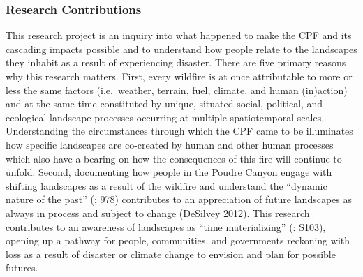 \documentclass[
]{article}
\begin{document}
\subsubsection{Research Contributions}\label{research-contributions}

This research project is an inquiry into what happened to make the CPF and its cascading impacts possible and to understand how people relate to the landscapes they inhabit as a result of experiencing disaster. There are five primary reasons why this research matters. First, every wildfire is at once attributable to more or less the same factors (i.e.~weather, terrain, fuel, climate, and human (in)action) and at the same time constituted by unique, situated social, political, and ecological landscape processes occurring at multiple spatiotemporal scales. Understanding the circumstances through which the CPF came to be illuminates how specific landscapes are co-created by human and other human processes which also have a bearing on how the consequences of this fire will continue to unfold. Second, documenting how people in the Poudre Canyon engage with shifting landscapes as a result of the wildfire and understand the ``dynamic nature of the past'' (: 978) contributes to an appreciation of future landscapes as always in process and subject to change (DeSilvey 2012). This research contributes to an awareness of landscapes as ``time materializing'' (: S103), opening up a pathway for people, communities, and governments reckoning with loss as a result of disaster or climate change to envision and plan for possible futures.
\end{document}
